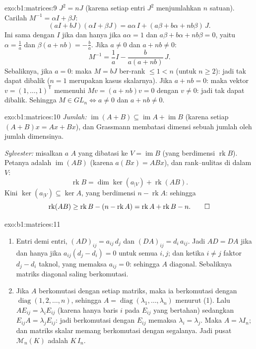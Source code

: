\begin{solution}{exo:b1:matrices:9}
$J^2 = nJ$ (karena setiap entri $J^2$ menjumlahkan $n$ satuan). Carilah $M^{-1} =
\alpha I + \beta J$:
\[
(aI + bJ)(\alpha I + \beta J)
= a\alpha\, I + (a\beta + b\alpha + nb\beta)\, J .
\]
Ini sama dengan $I$ jika dan hanya jika $a\alpha = 1$ dan $a\beta + b\alpha + nb\beta =
0$, yaitu $\alpha = \frac1a$ dan $\beta(a + nb) = -\frac ba$. Jika $a
\neq 0$ dan $a + nb \neq 0$:
\[
M^{-1} = \frac 1a I - \frac{b}{a(a + nb)}\, J .
\]
Sebaliknya, jika $a = 0$: maka $M = bJ$ ber-rank $\leq 1 < n$ (untuk $n \geq
2$): jadi tak dapat dibalik ($n = 1$ merupakan kasus skalarnya). Jika $a + nb = 0$:
maka vektor $v = (1, \dots, 1)^{\mathsf T}$ memenuhi $Mv = (a +
nb)v = 0$ dengan $v \neq 0$: jadi tak dapat dibalik. Sehingga $M \in GL_n \iff a
\neq 0$ dan $a + nb \neq 0$.
\end{solution}

\begin{solution}{exo:b1:matrices:10}
\emph{Jumlah:} $\operatorname{im}(A + B) \subseteq \operatorname{im} A
+ \operatorname{im} B$ (karena setiap $(A+B)x = Ax + Bx$), dan Grassmann
membatasi dimensi sebuah jumlah oleh jumlah dimensinya.

\emph{Sylvester:} misalkan $a$  $A$ yang dibatasi ke $V =
\operatorname{im} B$ (yang berdimensi $\operatorname{rk} B$). Petanya adalah
$\operatorname{im}(AB)$ (karena $a(Bx) = ABx$), dan rank--nulitas di dalam $V$:
\[
\operatorname{rk} B = \dim\ker(a_{|V}) + \operatorname{rk}(AB) .
\]
Kini $\ker(a_{|V}) \subseteq \ker A$, yang berdimensi $n -
\operatorname{rk} A$: sehingga
\[
\operatorname{rk}(AB) \geq \operatorname{rk} B - (n -
\operatorname{rk} A) = \operatorname{rk} A + \operatorname{rk} B -
n . \qedhere
\]
\end{solution}

\begin{solution}{exo:b1:matrices:11}
\begin{enumerate}
  \item Entri demi entri, $(AD)_{ij} = a_{ij}\,d_j$ dan $(DA)_{ij} =
        d_i\,a_{ij}$. Jadi $AD = DA$ jika dan hanya jika $a_{ij}(d_j - d_i) = 0$
        untuk semua $i, j$; dan ketika $i \neq j$ faktor $d_j - d_i$
        taknol, yang memaksa $a_{ij} = 0$: sehingga $A$ diagonal.
        Sebaliknya matriks diagonal saling berkomutasi.
  \item Jika $A$ berkomutasi dengan setiap matriks, maka ia berkomutasi dengan
        $\operatorname{diag}(1, 2, \dots, n)$, sehingga $A =
        \operatorname{diag}(\lambda_1, \dots, \lambda_n)$ menurut (1).
        Lalu $A E_{ij} = \lambda_i E_{ij}$ (karena hanya baris $i$ pada
        $E_{ij}$ yang bertahan) sedangkan $E_{ij} A = \lambda_j E_{ij}$:
        jadi berkomutasi dengan $E_{ij}$ memaksa $\lambda_i = \lambda_j$.
        Maka $A = \lambda I_n$; dan matriks skalar memang berkomutasi
        dengan segalanya. Jadi pusat $\mathcal{M}_n(K)$ adalah
        $K\,I_n$.
\end{enumerate}
\end{solution}

